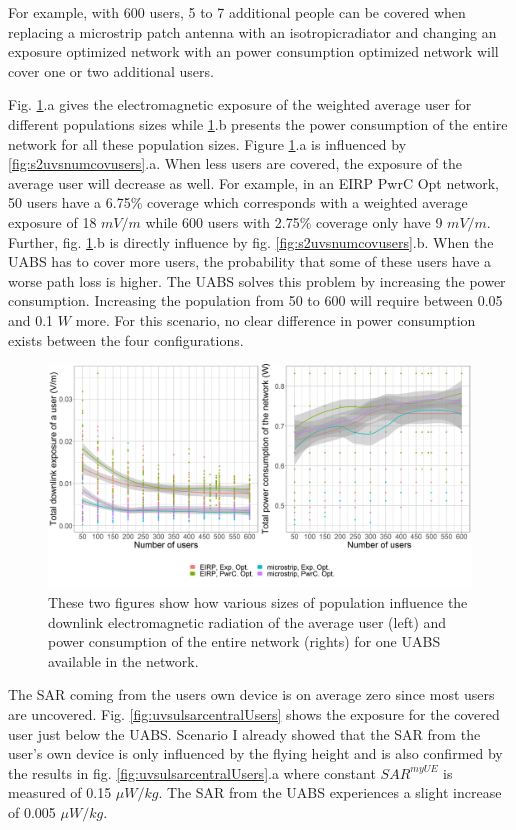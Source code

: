 \documentclass[twocolumn]{phdsymp} %
\begin{document}
For example, with 600 users, 5 to 7 additional 
people can be covered when replacing a microstrip patch antenna with an \gls{isotropicradiator}
and changing an exposure optimized network with an power consumption optimized network will 
cover one or two additional users.


\FloatBarrier
Fig. \ref{fig:s2b_dlAndPc}.a gives the electromagnetic exposure of the weighted average user for different populations sizes 
while \ref{fig:s2b_dlAndPc}.b presents the power consumption of the entire network for all these population sizes.
Figure  \ref{fig:s2b_dlAndPc}.a  is influenced by  \ref{fig:s2uvsnumcovusers}.a. When less users are 
covered, the exposure of the average user will decrease as well.
For example, in an EIRP \gls{PwrC Opt} network, 50 users have a 6.75\% coverage which corresponds with a weighted average exposure of  18 $mV/m$
while 600 users with 2.75\% coverage only have 9 $mV/m$.
Further,  fig. \ref{fig:s2b_dlAndPc}.b is directly influence by fig. \ref{fig:s2uvsnumcovusers}.b. When the \gls{UABS} has to cover more users,
the probability that some of these users have a worse path loss is higher. The \gls{UABS} solves this problem by increasing the 
power consumption. Increasing the population from 50 to 600 will require between 0.05 and 0.1 $W$ more. 
For this scenario, no clear difference in power consumption exists between the four configurations.
\begin{figure}[h!]
  \includegraphics[width=\linewidth]{s2/uvsdlAndPc.png}
  \caption{These two figures show how various sizes of population influence the downlink electromagnetic radiation of the average user (left) and 
  power consumption of the entire network (rights) for one \acs{UABS} available in the network.}
  \label{fig:s2b_dlAndPc}
\end{figure}

The \gls{SAR} coming from the 
users own device is on average zero since most users are uncovered.
Fig. \ref{fig:uvsulsarcentralUsers} shows the exposure for the covered user
just below the \gls{UABS}.
Scenario I already showed that the \gls{SAR} from the user's own device is only influenced by the flying height
and is also confirmed by the results in fig. \ref{fig:uvsulsarcentralUsers}.a where constant $SAR^{myUE}$ is measured of 0.15 $\mu W/kg$.
The \gls{SAR} from the \gls{UABS} experiences a slight increase of 0.005 $\mu W/kg$.
\end{document}
